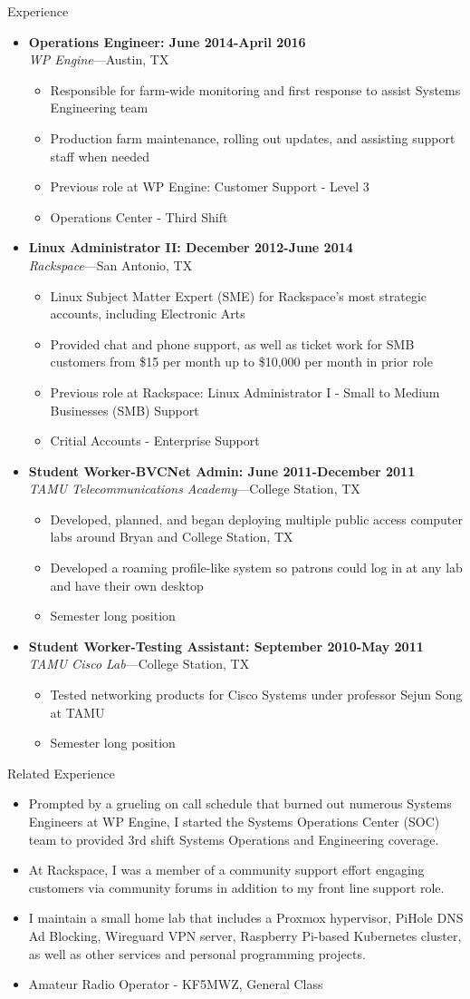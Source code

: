 \documentclass[10pt,oneside]{article}
\newenvironment{ressection}[1]{
    \vspace{4pt}
    {\fontfamily{phv}\selectfont\Large#1}
    \begin{itemize}
    \vspace{3pt}
}{
    \end{itemize}
}
\newcommand{\resitem}[1]{
    \vspace{-4pt}
    \item \begin{flushleft} #1 \end{flushleft}
}
\newcommand{\ressubitem}[1]{
    \vspace{-1pt}
    \item \begin{flushleft} #1 \end{flushleft}
}
\newcommand{\resbigitem}[3]{
    \vspace{-5pt}
    \item
    \textbf{#3} \\
    \textit{#1}---#2
}
\newenvironment{ressubsec}[3]{
    \resbigitem{#1}{#2}{#3}
    \vspace{-2pt}
    \begin{itemize}
}{
    \end{itemize}
}
\begin{document}
\begin{ressection}{Experience}
    \begin{ressubsec}{WP Engine}{Austin, TX}{Operations Engineer: June 2014-April 2016}
        \ressubitem{Responsible for farm-wide monitoring and first response to assist Systems Engineering team}
        \ressubitem{Production farm maintenance, rolling out updates, and assisting support staff when needed}
        \ressubitem{Previous role at WP Engine: Customer Support - Level 3}
        \ressubitem{Operations Center - Third Shift}
    \end{ressubsec}

    \begin{ressubsec}{Rackspace}{San Antonio, TX}{Linux Administrator II: December 2012-June 2014}
        \ressubitem{Linux Subject Matter Expert (SME) for Rackspace's most strategic accounts, including Electronic Arts}
        \ressubitem{Provided chat and phone support, as well as ticket work for SMB customers from \$15 per month up to \$10,000 per month in prior role}
        \ressubitem{Previous role at Rackspace: Linux Administrator I - Small to Medium Businesses (SMB) Support}
        \ressubitem{Critial Accounts - Enterprise Support}
    \end{ressubsec}

    \begin{ressubsec}{TAMU Telecommunications Academy}{College Station, TX}{Student Worker-BVCNet Admin: June 2011-December 2011}
        \ressubitem{Developed, planned, and began deploying multiple public access computer labs around Bryan and College Station, TX}
        \ressubitem{Developed a roaming profile-like system so patrons could log in at any lab and have their own desktop}
        \ressubitem{Semester long position}
    \end{ressubsec}

    \begin{ressubsec}{TAMU Cisco Lab}{College Station, TX}{Student Worker-Testing Assistant: September 2010-May 2011}
        \ressubitem{Tested networking products for Cisco Systems under professor Sejun Song at TAMU}
        \ressubitem{Semester long position}
    \end{ressubsec}

\end{ressection}

\begin{ressection}{Related Experience}
    \resitem{Prompted by a grueling on call schedule that burned out numerous Systems Engineers at WP Engine, I started the Systems Operations Center (SOC) team to provided 3rd shift Systems Operations and Engineering coverage.}
    \resitem{At Rackspace, I was a member of a community support effort engaging customers via community forums in addition to my front line support role.}
    \resitem{I maintain a small home lab that includes a Proxmox hypervisor, PiHole DNS Ad Blocking, Wireguard VPN server, Raspberry Pi-based Kubernetes cluster, as well as other services and personal programming projects.}
    \resitem{Amateur Radio Operator - KF5MWZ, General Class}
    
\end{ressection}
\end{document}
